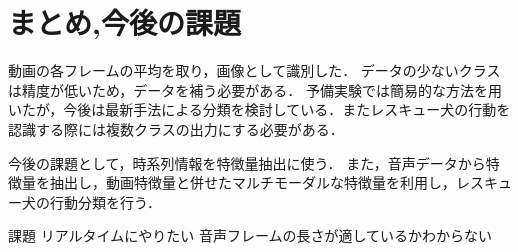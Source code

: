 \chapter{まとめ,今後の課題}
動画の各フレームの平均を取り，画像として識別した．
データの少ないクラスは精度が低いため，データを補う必要がある．
予備実験では簡易的な方法を用いたが，今後は最新手法による分類を検討している．またレスキュー犬の行動を認識する際には複数クラスの出力にする必要がある．


今後の課題として，時系列情報を特徴量抽出に使う．
また，音声データから特徴量を抽出し，動画特徴量と併せたマルチモーダルな特徴量を利用し，レスキュー犬の行動分類を行う．


課題
リアルタイムにやりたい
音声フレームの長さが適しているかわからない
{\scriptsize %
%


}
% 
% 


